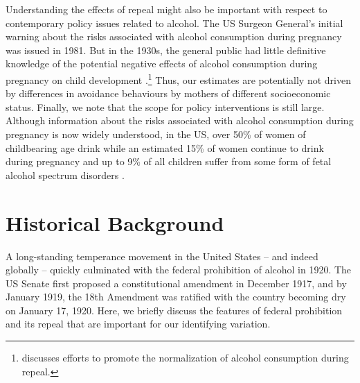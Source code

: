 \documentclass[12pt]{article}
\begin{document}
Understanding the effects of repeal might also be important with respect to contemporary policy issues related to alcohol. 
The US Surgeon General's initial warning about the risks associated with alcohol consumption during pregnancy was issued in 1981. 
But in the 1930s, the general public had little definitive knowledge of the potential negative effects of alcohol consumption during pregnancy on child development .\footnote{ discusses efforts to promote the normalization of alcohol consumption during repeal.}
Thus, our estimates are potentially not driven by differences in avoidance behaviours by mothers of different socioeconomic status. 
Finally, we note that the scope for policy interventions is still large. 
Although information about the risks associated with alcohol consumption during pregnancy is now widely understood, in the US, over 50\% of women of childbearing age drink  while an estimated 15\% of women continue to drink during pregnancy  and up to 9\% of all children suffer from some form of fetal alcohol spectrum disorders .


\section{Historical Background} \label{sec:background}

A long-standing temperance movement in the United States -- and indeed globally  -- quickly culminated with the federal prohibition of alcohol in 1920. 
The US Senate first proposed a constitutional amendment in December 1917, and by January 1919, the 18th Amendment was ratified with the country becoming dry on January 17, 1920. 
Here, we briefly discuss the features of federal prohibition and its repeal that are important for our identifying variation. 
\end{document}
